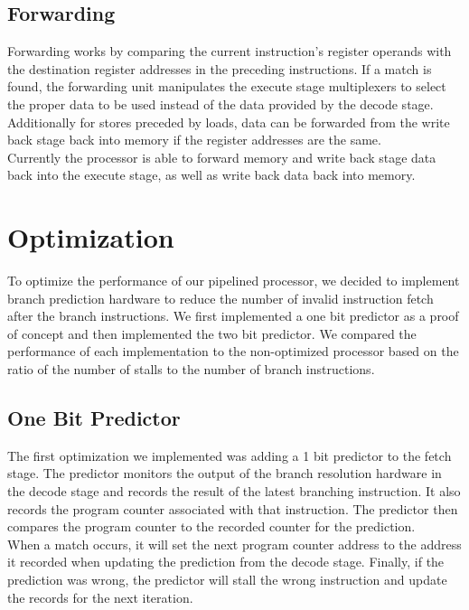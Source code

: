 \documentclass[12pt]{IEEEtran} %
\begin{document}
\subsection{Forwarding} %
\label{sub:forwarding}
Forwarding works by comparing the current instruction’s register operands with the destination register addresses in the preceding instructions. If a match is found, the forwarding unit manipulates the execute stage multiplexers to select the proper data to be used instead of the data provided by the decode stage. Additionally for stores preceded by loads, data can be forwarded from the write back stage back into memory if the register addresses are the same.\\ Currently the processor is able to forward memory and write back stage data back into the execute stage, as well as write back data back into memory.



\section{Optimization} %
\label{sec:optimisation}
To optimize the performance of our pipelined processor, we decided to implement branch prediction hardware to reduce the number of invalid instruction fetch after the branch instructions. We first implemented a one bit predictor as a proof of concept and then implemented the two bit predictor. We compared the performance of each implementation to the non-optimized processor based on the ratio of the number of stalls to the number of branch instructions.

\subsection{One Bit Predictor} %
\label{sec:1_bit_predictor}
The first optimization we implemented was adding a 1 bit predictor to the fetch stage. The predictor monitors the output of the branch resolution hardware in the decode stage and records the result of the latest branching instruction. It also records the program counter associated with that instruction. The predictor then compares the program counter to the recorded counter for the prediction. \\
When a match occurs, it will set the next program counter address to the address it recorded when updating the prediction from the decode stage. Finally, if the prediction was wrong, the predictor will stall the wrong instruction and update the records for the next iteration.  
\end{document}
